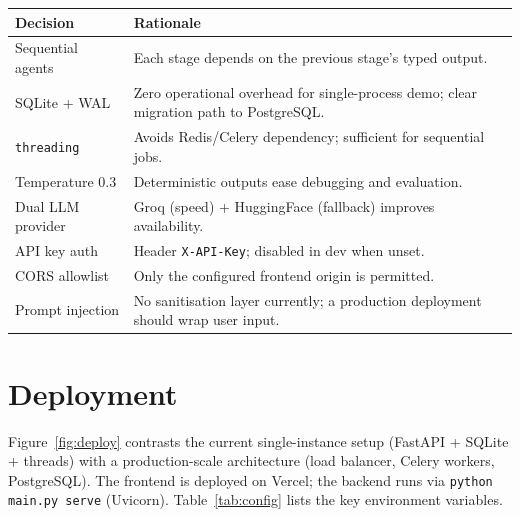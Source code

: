 \documentclass[10pt, twocolumn]{article}
\begin{document}
\begin{center}
\small
\begin{tabular}{p{2.0cm} p{4.5cm}}
  \toprule
  \textbf{Decision} & \textbf{Rationale} \\
  \midrule
  Sequential agents   & Each stage depends on the previous stage's typed output. \\
  SQLite + WAL        & Zero operational overhead for single-process demo; clear migration path to PostgreSQL. \\
  \texttt{threading}  & Avoids Redis/Celery dependency; sufficient for sequential jobs. \\
  Temperature 0.3     & Deterministic outputs ease debugging and evaluation. \\
  Dual LLM provider   & Groq (speed) + HuggingFace (fallback) improves availability. \\
  \midrule
  API key auth        & Header \texttt{X-API-Key}; disabled in dev when unset. \\
  CORS allowlist      & Only the configured frontend origin is permitted. \\
  Prompt injection    & No sanitisation layer currently; a production deployment should wrap user input. \\
  \bottomrule
\end{tabular}
\end{center}

\section{Deployment}

Figure~\ref{fig:deploy} contrasts the current single-instance setup (FastAPI +
SQLite + threads) with a production-scale architecture (load balancer, Celery
workers, PostgreSQL). The frontend is deployed on Vercel; the backend runs via
\texttt{python main.py serve} (Uvicorn). Table~\ref{tab:config} lists the key
environment variables.
\end{document}
